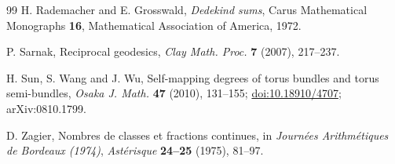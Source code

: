 \documentclass[11pt]{article}
\theoremstyle{definition}
\begin{document}
\begin{thebibliography}{99}
H. Rademacher and E. Grosswald, \emph{Dedekind sums}, Carus Mathematical
Monographs \textbf{16}, Mathematical Association of America, 1972.

P. Sarnak, Reciprocal geodesics, \emph{Clay Math. Proc.} \textbf{7}
(2007), 217--237.

H. Sun, S. Wang and J. Wu, Self-mapping degrees of torus bundles and
torus semi-bundles, \emph{Osaka J. Math.} \textbf{47} (2010), 131--155;
\href{https://doi.org/10.18910/4707}{doi:10.18910/4707}; arXiv:0810.1799.

D. Zagier, Nombres de classes et fractions continues, in
\emph{Journ\'ees Arithm\'etiques de Bordeaux (1974)},
\emph{Ast\'erisque} \textbf{24--25} (1975), 81--97.

\end{thebibliography}
\end{document}
